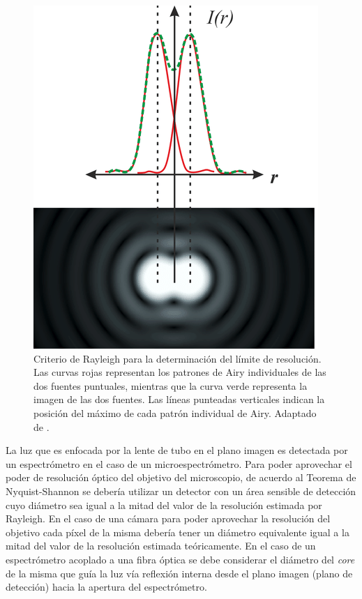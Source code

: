 \begin{figure}[H]
	\centering
	\includegraphics[scale=1.0]{Figs/microespectrometro/raylspa.png}
	\caption{Criterio de Rayleigh para la determinación del límite de resolución. Las curvas rojas representan los patrones de Airy individuales de las dos fuentes puntuales, mientras que la curva verde representa la imagen de las dos fuentes. Las líneas punteadas verticales indican la posición del máximo de cada patrón individual de Airy. Adaptado de \cite{raylsp}.}
	\label{fig:critrayspa}
\end{figure}

La luz que es enfocada por la lente de tubo en el plano imagen es detectada por un espectrómetro en el caso de un microespectrómetro. Para poder aprovechar el poder de resolución óptico del objetivo del microscopio, de acuerdo al Teorema de Nyquist-Shannon se debería utilizar un detector con un área sensible de detección cuyo diámetro sea igual a la mitad del valor de la resolución estimada por Rayleigh. En el caso de una cámara para poder aprovechar la resolución del objetivo cada píxel de la misma debería tener un diámetro equivalente igual a la mitad del valor de la resolución estimada teóricamente. En el caso de un espectrómetro acoplado a una fibra óptica se debe considerar el diámetro del \textit{core} de la misma que guía la luz vía reflexión interna desde el plano imagen (plano de detección) hacia la apertura del espectrómetro.

